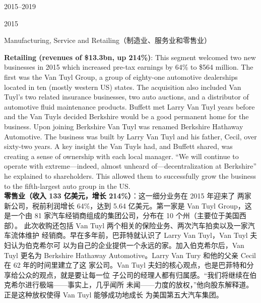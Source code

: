 \begin{chapter}{2015--2019}
\begin{section}{2015}
\begin{subsection}{Manufacturing, Service and Retailing（制造业、服务业和零售业）}
\begin{verseparallel}
{    \textbf{Retailing (revenues of \$13.3bn, up 214\%)}: This segment welcomed
    two new businesses in 2015 which increased pre-tax earnings by 64\% to \$564
    million. The first was the Van Tuyl Group, a group of eighty-one automotive
    dealerships located in ten (mostly western US) states. The acquisition also
    included Van Tuyl’s two related insurance businesses, two auto auctions,
    and a distributor of automotive fluid maintenance products. Buffett met
    Larry Van Tuyl years before and the Van Tuyls decided Berkshire would be a
    good permanent home for the business. Upon joining Berkshire Van Tuyl was
    renamed Berkshire Hathaway Automotive. The business was built by Larry Van
    Tuyl and his father, Cecil, over sixty-two years. A key insight the Van
    Tuyls had, and Buffett shared, was creating a sense of ownership with each
    local manager. ``We will continue to operate with extreme—indeed, almost
    unheard of—decentralization at Berkshire'' he explained to shareholders.
    This allowed them to successfully grow the business to the fifth-largest
    auto group in the US\@.  \\

  }
  {
    \textbf{零售业（收入 133 亿美元，增长 214\%）}：这一细分业务在 2015 年迎来了
    两家新公司，税前利润增长 64\%，达到 5.64 亿美元。第一家是 Van Tuyl Group，这
    是一个由 81 家汽车经销商组成的集团公司，分布在 10 个州（主要位于美国西部）。
    此次收购还包括 Van Tuyl 两个相关的保险业务、两次汽车拍卖以及一家汽车流体维护
    经销商。早在多年前，巴菲特就认识了 Larry Van Tuyl，Van Tuyl 夫妇认为伯克希尔可
    以为自己的企业提供一个永远的家。加入伯克希尔后，Van Tuyl 更名为 Berkshire
    Hathaway Automotive。Larry Van Tury 和他的父亲 Cecil 在 62 年的时间里建立了这
    家公司。Van Tuyl 夫妇的核心观点，也是巴菲特和分享给公众的观点，就是要让每一位
    子公司的经理人都有归属感。“我们将继续在伯克希尔进行极端——事实上，几乎闻所
    未闻——力度的放权，”他向股东解释道。正是这种放权使得 Van Tuyl 能够成功地成长
    为美国第五大汽车集团。
  }
\end{verseparallel}


\end{subsection}
\end{section}
\end{chapter}
